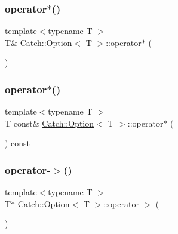 \mbox{\label{class_catch_1_1_option_afd989852fa453731c3190dac63caccb0}} 
\subsubsection{\texorpdfstring{operator$\ast$()}{operator*()}\hspace{0.1cm}{\footnotesize\ttfamily [1/2]}}
{\footnotesize\ttfamily template$<$typename T $>$ \\
T\& \mbox{\hyperlink{class_catch_1_1_option}{Catch\+::\+Option}}$<$ T $>$\+::operator$\ast$ (\begin{DoxyParamCaption}{ }\end{DoxyParamCaption})\hspace{0.3cm}{\ttfamily [inline]}}

\mbox{\label{class_catch_1_1_option_a734fc9c2eb1a1f7f8e8f6a4eb12160f0}} 
\subsubsection{\texorpdfstring{operator$\ast$()}{operator*()}\hspace{0.1cm}{\footnotesize\ttfamily [2/2]}}
{\footnotesize\ttfamily template$<$typename T $>$ \\
T const\& \mbox{\hyperlink{class_catch_1_1_option}{Catch\+::\+Option}}$<$ T $>$\+::operator$\ast$ (\begin{DoxyParamCaption}{ }\end{DoxyParamCaption}) const\hspace{0.3cm}{\ttfamily [inline]}}

\mbox{\label{class_catch_1_1_option_acad340798a16c8f700f8763119e90f31}} 
\subsubsection{\texorpdfstring{operator-\/$>$()}{operator->()}\hspace{0.1cm}{\footnotesize\ttfamily [1/2]}}
{\footnotesize\ttfamily template$<$typename T $>$ \\
T$\ast$ \mbox{\hyperlink{class_catch_1_1_option}{Catch\+::\+Option}}$<$ T $>$\+::operator-\/$>$ (\begin{DoxyParamCaption}{ }\end{DoxyParamCaption})\hspace{0.3cm}{\ttfamily [inline]}}

